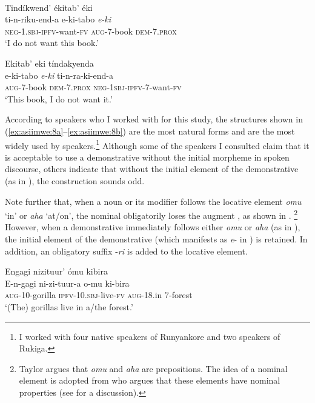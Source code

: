 \documentclass[output=paper 		  ]{langscibook}
\begin{document}
\newpage
\ex%
    \label{ex:asiimwe:8} \citet[181]{Asiimwe2014}\\
    \ea\label{ex:asiimwe:8a} Tindíkwend’ ékitab’ éki\\
    \gll ti-n-riku-end-a    e-ki-tabo  \emph{e-ki}\\
    \textsc{neg-1.sbj-ipfv}{}-want-\textsc{fv}  \textsc{aug-7}{}-book  \textsc{dem-7.prox}\\
    \glt ‘I do not want this book.’

\ex\label{ex:asiimwe:8b}  Ekitab’ eki tíndakyenda \\
    \gll e-ki-tabo  \emph{e-ki}  ti-n-ra-ki-end-a\\
    \textsc{aug-7}{}-book  \textsc{dem-7.prox}  \textsc{neg-1sbj}{}-\textsc{ipfv}-7-want-\textsc{fv}\\
    \glt ‘This book, I do not want it.’
    \z
\z

According to speakers who I worked with for this study, the structures shown in (\ref{ex:asiimwe:8a}--\ref{ex:asiimwe:8b}) are the most natural forms and are the most widely used by speakers.\footnote{I worked with four native speakers of Runyankore and two speakers of Rukiga.} Although some of the speakers I consulted claim that it is acceptable to use a demonstrative without the initial morpheme in spoken discourse, others indicate that without the initial element of the demonstrative (as in ), the construction sounds odd.

Note further that, when a noun or its modifier follows the locative element \textit{omu} ‘in’ or \textit{aha} ‘at/on’, the nominal obligatorily loses the augment \citep[88]{Taylor1985}, as shown in . \footnote{Taylor argues that \textit{omu} and \textit{aha} are prepositions. The idea of a nominal element is adopted from \citet{Asiimwe2014} who argues that these elements have nominal properties (see \citealt[143--145]{Asiimwe2014} for a discussion).} However, when a demonstrative immediately follows either \textit{omu} or \textit{aha} (as in ), the initial element of the demonstrative (which manifests as \textit{e}{}- in ) is retained. In addition, an obligatory suffix -\textit{ri} is added to the locative element.

\ea%
    \label{ex:asiimwe:9}
    \ea\label{ex:asiimwe:9a}  Engagi nizituur’ ómu kibira\\
    \gll E-n-gagi  ni-zi-tuur-a o-mu  ki-bira\\
    \textsc{aug}{}-10-gorilla  \textsc{ipfv-10.sbj-}live\textsc{{}-fv  aug-}18.in  7-forest\\
  \glt ‘(The) gorillas live in a/the forest.’
\end{document}
